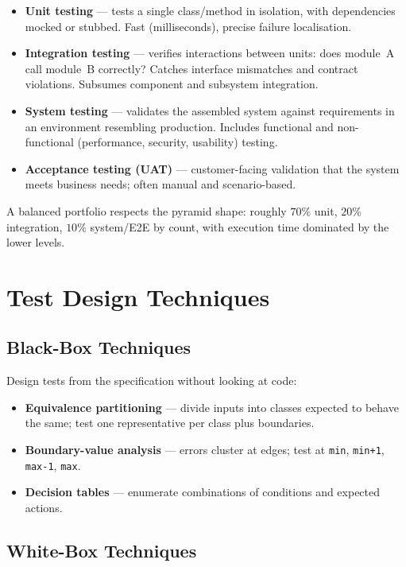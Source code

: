 \begin{itemize}
    \item \textbf{Unit testing} --- tests a single class/method in isolation, with dependencies mocked or stubbed. Fast (milliseconds), precise failure localisation.
    \item \textbf{Integration testing} --- verifies interactions between units: does module~A call module~B correctly? Catches interface mismatches and contract violations. Subsumes component and subsystem integration.
    \item \textbf{System testing} --- validates the assembled system against requirements in an environment resembling production. Includes functional and non-functional (performance, security, usability) testing.
    \item \textbf{Acceptance testing (UAT)} --- customer-facing validation that the system meets business needs; often manual and scenario-based.
\end{itemize}

A balanced portfolio respects the pyramid shape: roughly $70\%$ unit, $20\%$ integration, $10\%$ system/E2E by count, with execution time dominated by the lower levels.

\section{Test Design Techniques}

\subsection{Black-Box Techniques}

Design tests from the specification without looking at code:

\begin{itemize}
    \item \textbf{Equivalence partitioning} --- divide inputs into classes expected to behave the same; test one representative per class plus boundaries.
    \item \textbf{Boundary-value analysis} --- errors cluster at edges; test at \texttt{min}, \texttt{min+1}, \texttt{max-1}, \texttt{max}.
    \item \textbf{Decision tables} --- enumerate combinations of conditions and expected actions.
\end{itemize}

\subsection{White-Box Techniques}

